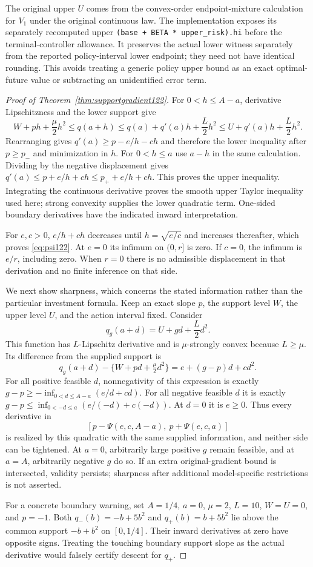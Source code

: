 The original upper $U$ comes from the convex-order endpoint-mixture
calculation for $V_1$ under the original continuous law. The implementation
exposes its separately recomputed upper
\texttt{(base + BETA * upper\_risk).hi} before the terminal-controller
allowance. It preserves the actual lower witness separately from the
reported policy-interval lower endpoint; they need not have identical
rounding. This avoids treating a generic policy upper bound as an exact
optimal-future value or subtracting an unidentified error term.

\begin{proof}[Proof of Theorem~\ref{thm:supportgradient122}]
For $0<h\le A-a$, derivative Lipschitzness and the lower support give
\[
 W+ph+\frac\mu2h^2
 \le q(a+h)
 \le q(a)+q'(a)h+\frac L2h^2
 \le U+q'(a)h+\frac L2h^2.
\]
Rearranging gives $q'(a)\ge p-e/h-ch$ and therefore the lower
inequality after $p\ge p_-$ and minimization in $h$.
For $0<h\le a$ use $a-h$ in the same calculation. Dividing by the
negative displacement gives $q'(a)\le p+e/h+ch\le p_++e/h+ch$.
This proves the upper inequality. Integrating the continuous derivative
proves the smooth upper Taylor inequality used here; strong convexity
supplies the lower quadratic term. One-sided boundary derivatives have
the indicated inward interpretation.

For $e,c>0$, $e/h+ch$ decreases until $h=\sqrt{e/c}$ and increases
thereafter, which proves \eqref{eq:psi122}. At $e=0$ its infimum on
$(0,r]$ is zero. If $c=0$, the infimum is $e/r$, including zero.
When $r=0$ there is no admissible displacement in that derivation and
no finite inference on that side.

We next show sharpness, which concerns the stated information rather than
the particular investment formula. Keep an exact slope $p$, the support
level $W$, the upper level $U$, and the action interval fixed. Consider
\[
 q_g(a+d)=U+gd+\frac L2d^2.
\]
This function has $L$-Lipschitz derivative and is $\mu$-strongly convex
because $L\ge\mu$. Its difference from the supplied support is
\[
 q_g(a+d)-\{W+pd+\tfrac\mu2d^2\}
       =e+(g-p)d+cd^2.
\]
For all positive feasible $d$, nonnegativity of this expression is
exactly $g-p\ge-\inf_{0<d\le A-a}(e/d+cd)$.
For all negative feasible $d$ it is exactly
$g-p\le\inf_{0<-d\le a}(e/(-d)+c(-d))$.
At $d=0$ it is $e\ge0$. Thus every derivative in
\[
 [p-\Psi(e,c,A-a),\ p+\Psi(e,c,a)]
\]
is realized by this quadratic with the same supplied information,
and neither side can be tightened. At $a=0$, arbitrarily large positive
$g$ remain feasible, and at $a=A$, arbitrarily negative $g$ do so.
If an extra original-gradient bound is intersected, validity persists;
sharpness after additional model-specific restrictions is not asserted.

For a concrete boundary warning, set $A=1/4$, $a=0$, $\mu=2$,
$L=10$, $W=U=0$, and $p=-1$. Both
$q_-(b)=-b+5b^2$ and $q_+(b)=b+5b^2$ lie above the common support
$-b+b^2$ on $[0,1/4]$. Their inward derivatives at zero have opposite
signs. Treating the touching boundary support slope as the actual
derivative would falsely certify descent for $q_+$.
\end{proof}

